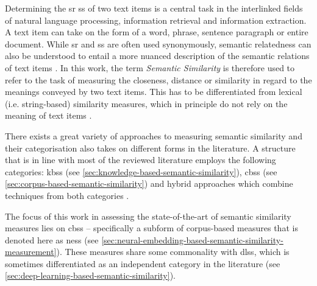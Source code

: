 \documentclass[11pt, numbers=noenddot]{scrreprt}
\let\cite\parencite  %
\begin{document}
Determining the \gls{sr} \gls{ss} of two text items is a central task in the interlinked fields of natural language processing, information retrieval and information extraction. A text item can take on the form of a word, phrase, sentence paragraph or entire document. While \gls{sr} and \gls{ss} are often used synonymously, semantic relatedness can also be understood to entail a more nuanced description of the semantic relations of text items \cite{chandrasekaranEvolutionSemanticSimilarity2021, harispeSemanticSimilarityNatural2015}.  In this work, the term \textit{Semantic Similarity} is therefore used to refer to the task of measuring the closeness, distance or similarity in regard to the meanings conveyed by two text items. This has to be differentiated from lexical (i.e. string-based) similarity measures, which in principle do not rely on the meaning of text items \cite{p.SurveySemanticSimilarity2019}. 

There exists a great variety of approaches to measuring semantic similarity and their categorisation also takes on different forms in the literature.
A structure that is in line with most of the reviewed literature employs the following categories: \gls{kbss} (see \cref{sec:knowledge-based-semantic-similarity}), \gls{cbss} (see \cref{sec:corpus-based-semantic-similarity}) and hybrid approaches which combine techniques from both categories
\cite{chandrasekaranEvolutionSemanticSimilarity2021, harispeSemanticSimilarityNatural2015, hanSurveyTechniquesApplications2021, zadSurveyDeepLearning2021}.

The focus of this work in assessing the state-of-the-art of semantic similarity measures lies on \gls{cbss} -- specifically a subform of corpus-based measures that is denoted here as \gls{ness} (see \cref{sec:neural-embedding-based-semantic-similarity-measurement}). These measures share some commonality with \gls{dlss}, which is sometimes differentiated as an independent category in the literature (see \cref{sec:deep-learning-based-semantic-similarity}).
\end{document}
